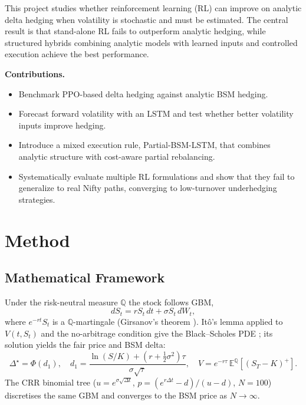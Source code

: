 \documentclass[10pt,a4paper]{article}
\begin{document}
This project studies whether reinforcement learning (RL) can improve on
analytic delta hedging when volatility is stochastic and must be estimated. The
central result is that stand-alone RL fails to outperform analytic hedging,
while structured hybrids combining analytic models with learned inputs and
controlled execution achieve the best performance.

\textbf{Contributions.}
\begin{itemize}[leftmargin=*]
  \item Benchmark PPO-based delta hedging against analytic BSM hedging.
  \item Forecast forward volatility with an LSTM and test whether better
        volatility inputs improve hedging.
  \item Introduce a mixed execution rule, Partial-BSM-LSTM, that combines
        analytic structure with cost-aware partial rebalancing.
  \item Systematically evaluate multiple RL formulations and show that they
        fail to generalize to real Nifty paths, converging to low-turnover
        underhedging strategies.
\end{itemize}

\section{Method}
\subsection*{Mathematical Framework}
Under the risk-neutral measure $\mathbb{Q}$ the stock follows GBM,
\[
  dS_t = r S_t\,dt + \sigma S_t\,dW_t,
\]
where $e^{-rt}S_t$ is a $\mathbb{Q}$-martingale (Girsanov's theorem \cite{Shreve2004}).
It\^{o}'s lemma applied to $V(t,S_t)$ and the no-arbitrage condition give
the Black--Scholes PDE \cite{Black1973,Merton1973}; its solution yields the fair price and BSM delta:
\[
  \Delta^\star = \Phi(d_1),\quad
  d_1 = \frac{\ln(S/K)+(r+\tfrac12\sigma^2)\tau}{\sigma\sqrt{\tau}},\quad
  V = e^{-r\tau}\,\mathbb{E}^{\mathbb{Q}}[(S_T-K)^+].
\]
The CRR binomial tree \cite{Cox1979} ($u=e^{\sigma\sqrt{\Delta t}}$, $p=(e^{r\Delta t}-d)/(u-d)$,
$N=100$) discretises the same GBM and converges to the BSM price as $N\to\infty$.
\end{document}
